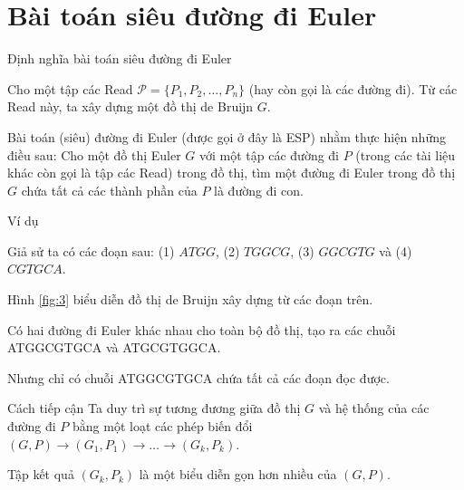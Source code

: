\documentclass[10pt]{beamer}
\theoremstyle{remark}
\numberwithin{algocf}{section}
\numberwithin{equation}{section}
\numberwithin{dl}{section}
\numberwithin{figure}{section}
\begin{document}
\section{Bài toán siêu đường đi Euler}

\begin{frame}{Định nghĩa bài toán siêu đường đi Euler}

    Cho một tập các Read $\mathcal{P} = \lbrace P_1, P_2, \dots, P_n \rbrace$ (hay còn gọi là các đường đi).
    Từ các Read này, ta xây dựng một đồ thị de Bruijn $G$.


    Bài toán (siêu) đường đi Euler (được gọi ở đây là ESP) nhằm thực hiện những điều sau:
    Cho một đồ thị Euler $G$ với một tập các đường đi $P$ (trong các tài liệu khác còn gọi là tập các Read) trong đồ thị, tìm một đường đi Euler trong đồ thị $G$ chứa tất cả các thành phần của $P$ là đường đi con.
\end{frame}

\begin{frame}{Ví dụ}

    Giả sử ta có các đoạn sau: (1) $ATGG$, (2) $TGGCG$, (3) $GGCGTG$ và (4) $CGTGCA$.

    Hình \ref{fig:3} biểu diễn đồ thị de Bruijn xây dựng từ các đoạn trên.

    Có hai đường đi Euler khác nhau cho toàn bộ đồ thị, tạo ra các chuỗi ATGGCGTGCA và ATGCGTGGCA.

    Nhưng chỉ có chuỗi ATGGCGTGCA chứa tất cả các đoạn đọc được.

    
\end{frame}

\begin{frame}{Cách tiếp cận}
    Ta duy trì sự tương đương giữa đồ thị $G$ và hệ thống của các đường đi $P$ bằng một loạt các phép biến đổi $(G, P) \rightarrow (G_1, P_1) \rightarrow \dots \rightarrow (G_k, P_k)$.

    Tập kết quả $(G_k, P_k)$ là một biểu diễn gọn hơn nhiều của $(G, P)$.
    
\end{frame}
\end{document}
